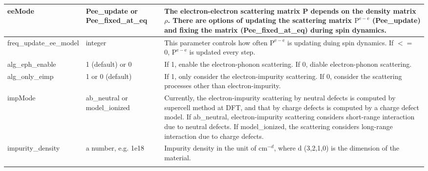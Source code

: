 \documentclass{article}
\begin{document}
\begin{xltabular}{\textwidth}{X X X}
		eeMode & Pee\_update or Pee\_fixed\_at\_eq & The electron-electron scattering matrix P depends on the density matrix $\rho$. There are options of updating the scattering matrix $\mathrm{P^{e-e}}$ (Pee\_update) and fixing the matrix (Pee\_fixed\_at\_eq) during spin dynamics.\\
		\midrule
		
		freq\_update\_ee\_model & integer & This parameter controls how often $\mathrm{P^{e-e}}$ is updating duing spin dynamics. If $<=$ 0, $\mathrm{P^{e-e}}$ is updated every step. \\
		\midrule
		
		alg\_eph\_enable & 1 (default) or 0 & If 1, enable the electron-phonon scattering. If 0, diable electron-phonon scattering.\\
		\midrule
		
		alg\_only\_eimp & 1 or 0 (default) & If 1, only consider the electron-impurity scattering. If 0, consider the scattering processes other than electron-impurity.\\
		\midrule
		
		impMode & ab\_neutral or model\_ionized & Currently, the electron-impurity scattering by neutral defects is computed by supercell method at DFT, and that by charge defects is computed by a charge defect model. If ab\_neutral, electron-impurity scattering considers short-range interaction due to neutral defects. If model\_ionized, the scattering considers long-range interaction due to charge defects.\\
		\midrule
		
		impurity\_density & a number, e.g. 1e18 & Impurity density in the unit of cm$^{-d}$, where d (3,2,1,0) is the dimension of the material.\\
		\midrule
		
		\bottomrule\bottomrule
		\label{tab:dmd}
	\end{xltabular}
	
	
\end{document}
